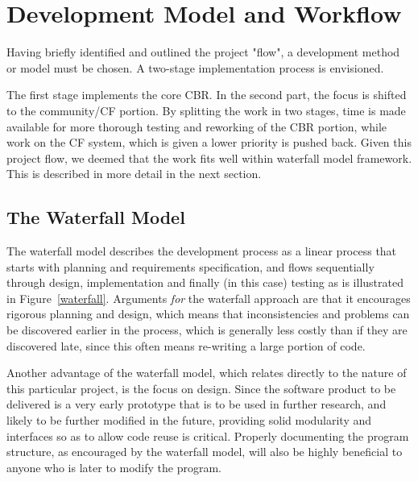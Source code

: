 \section{Development Model and Workflow}
Having briefly identified and outlined the project "flow", a development method or model must be chosen. A two-stage implementation process is envisioned.

The first stage implements the core CBR.  In the second part, the focus is shifted to the community/CF portion. By splitting the work in two stages, time is made available for more thorough testing and reworking of the CBR portion, while work on the CF system, which is given a lower priority is pushed back. Given this project flow, we deemed that the work fits well within waterfall model framework. This is described in more detail in the next section. 


\subsection{The Waterfall Model}
The waterfall model describes the development process as a linear process that starts with planning and requirements specification, and flows sequentially through design, implementation and finally (in this case) testing as is illustrated in Figure~\ref{waterfall}. Arguments \emph{for} the waterfall approach are that it encourages rigorous planning and design, which means that inconsistencies and problems can be discovered earlier in the process, which is generally less costly than if they are discovered late, since this often means re-writing a large portion of code. 

Another advantage of the waterfall model, which relates directly to the nature of this particular project, is the focus on design. Since the software product to be delivered is a very early prototype that is to be used in further research, and likely to be further modified in the future, providing solid modularity and interfaces so as to allow code reuse is critical. Properly documenting the program structure, as encouraged by the waterfall model, will also be highly beneficial to anyone who is later to modify the program.

